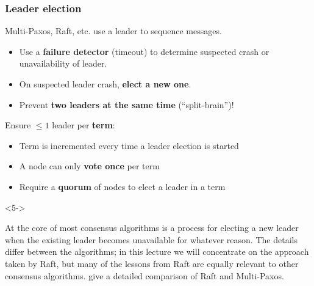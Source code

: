 \begin{frame}
    \label{s:leader-election}
    \frametitle{Leader election}
    Multi-Paxos, Raft, etc. use a leader to sequence messages.\pause
    \begin{itemize}
        \item Use a \textbf{failure detector} (timeout) to determine suspected crash or unavailability of leader.
        \item On suspected leader crash, \textbf{elect a new one}.\pause
        \item Prevent \textbf{two leaders at the same time} (``split-brain'')!\\[0.5em]\pause
    \end{itemize}
    Ensure $\le 1$ leader per \textbf{term}:
    \begin{itemize}
        \item Term is incremented every time a leader election is started\pause
        \item A node can only \textbf{vote once} per term
        \item Require a \textbf{quorum} of nodes to elect a leader in a term\\[0.5em]
    \end{itemize}
    \begin{uncoverenv}<5->
    \end{uncoverenv}
\end{frame}
\label{l:leader-election}

At the core of most consensus algorithms is a process for electing a new leader when the existing leader becomes unavailable for whatever reason.
The details differ between the algorithms; in this lecture we will concentrate on the approach taken by Raft, but many of the lessons from Raft are equally relevant to other consensus algorithms.
\citet{Howard:2020} give a detailed comparison of Raft and Multi-Paxos.

